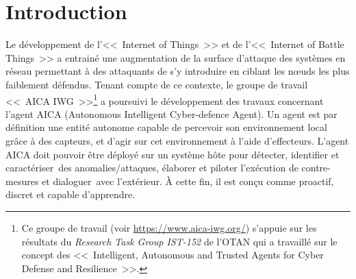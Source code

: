 



\section{Introduction}



Le développement de l'<<~Internet of Things~>> et de l'<<~Internet of Battle Things~>>  a entrainé une augmentation de la surface d'attaque des systèmes en réseau permettant à des attaquants de s'y introduire en ciblant les nœuds les plus faiblement défendus. Tenant compte de ce contexte, le groupe de travail <<~AICA IWG~>>\footnote{Ce groupe de travail (voir \url{https://www.aica-iwg.org/}) s'appuie sur les résultats du \textit{Research Task Group IST-152} de l'OTAN qui a travaillé sur le concept des <<~Intelligent, Autonomous and Trusted Agents for Cyber Defense and Resilience~>>.} a poursuivi le développement des travaux concernant l'agent AICA (Autonomous Intelligent Cyber-defence Agent).
Un agent est par définition une entité autonome capable de percevoir son environnement local grâce à des capteurs, et d'agir sur cet environnement à l'aide d'effecteurs\cite{russell1995modern}.
L'agent AICA doit pouvoir être déployé sur un système hôte pour détecter, identifier et caractériser des anomalies/attaques, élaborer et piloter l'exécution de contre-mesures et dialoguer avec l'extérieur. À cette fin, il est conçu comme proactif, discret et capable d'apprendre.


